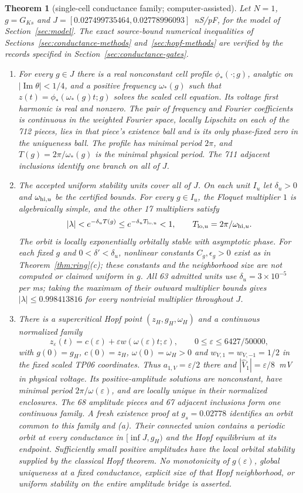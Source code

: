 \documentclass[11pt]{article}
\newtheorem{theorem}{Theorem}
\theoremstyle{definition}
\newcommand{\im}{\operatorname{Im}}
\begin{document}
\begin{theorem}[single-cell conductance family; computer-assisted]\label{thm:conductance}
Let $N=1$, $g=G_{Ks}$ and $J=[0.027499735464,0.02778996093]$~nS/pF, for the model of Section~\ref{sec:model}. The exact source-bound numerical inequalities of Sections~\ref{sec:conductance-methods} and~\ref{sec:hopf-methods} are verified by the records specified in Section~\ref{sec:conductance-gates}.
\begin{enumerate}
\item[(a)] For every $g\in J$ there is a real nonconstant cell profile $\phi_*(\cdot;g)$, analytic on $|\im\theta|<1/4$, and a positive frequency $\omega_*(g)$ such that $z(t)=\phi_*(\omega_*(g)t;g)$ solves the scaled cell equation. Its voltage first harmonic is real and nonzero. The pair of frequency and Fourier coefficients is continuous in the weighted Fourier space, locally Lipschitz on each of the 712 pieces, lies in that piece's existence ball and is its only phase-fixed zero in the uniqueness ball. The profile has minimal period $2\pi$, and $T(g)=2\pi/\omega_*(g)$ is the minimal physical period. The 711 adjacent inclusions identify one branch on all of $J$.
\item[(b)] The accepted uniform stability units cover all of $J$. On each unit $I_u$ let $\delta_u>0$ and $\omega_{{\rm hi},u}$ be the certified bounds. For every $g\in I_u$, the Floquet multiplier $1$ is algebraically simple, and the other 17 multipliers satisfy
\[
 |\lambda|<e^{-\delta_u T(g)}\le e^{-\delta_u T_{{\rm lo},u}}<1,
 \qquad T_{{\rm lo},u}=2\pi/\omega_{{\rm hi},u}.
\]
The orbit is locally exponentially orbitally stable with asymptotic phase. For each fixed $g$ and $0<\delta'<\delta_u$, nonlinear constants $C_g,\epsilon_g>0$ exist as in Theorem~\ref{thm:ring}(c); these constants and the neighborhood size are not computed or claimed uniform in $g$. All 63 admitted units use $\delta_u=3\times10^{-5}$ per ms; taking the maximum of their outward multiplier bounds gives $|\lambda|\le0.998413816$ for every nontrivial multiplier throughout $J$.
\item[(c)] There is a supercritical Hopf point $(z_H,g_H,\omega_H)$ and a continuous normalized family
\[
 z_\varepsilon(t)=c(\varepsilon)+\varepsilon w(\omega(\varepsilon)t;\varepsilon),
 \qquad 0\le\varepsilon\le6427/50000,
\]
with $g(0)=g_H$, $c(0)=z_H$, $\omega(0)=\omega_H>0$ and $w_{V,1}=w_{V,-1}=1/2$ in the fixed scaled TP06 coordinates. Thus $a_{1,V}=\varepsilon/2$ there and $|\widehat V_1|=\varepsilon/8$~mV in physical voltage. Its positive-amplitude solutions are nonconstant, have minimal period $2\pi/\omega(\varepsilon)$, and are locally unique in their normalized enclosures. The 68 amplitude pieces and 67 adjacent inclusions form one continuous family. A fresh existence proof at $g_s=0.02778$ identifies an orbit common to this family and (a). Their connected union contains a periodic orbit at every conductance in $[\inf J,g_H)$ and the Hopf equilibrium at its endpoint. Sufficiently small positive amplitudes have the local orbital stability supplied by the classical Hopf theorem. No monotonicity of $g(\varepsilon)$, global uniqueness at a fixed conductance, explicit size of that Hopf neighborhood, or uniform stability on the entire amplitude bridge is asserted.

\end{enumerate}
\end{theorem}
\end{document}
